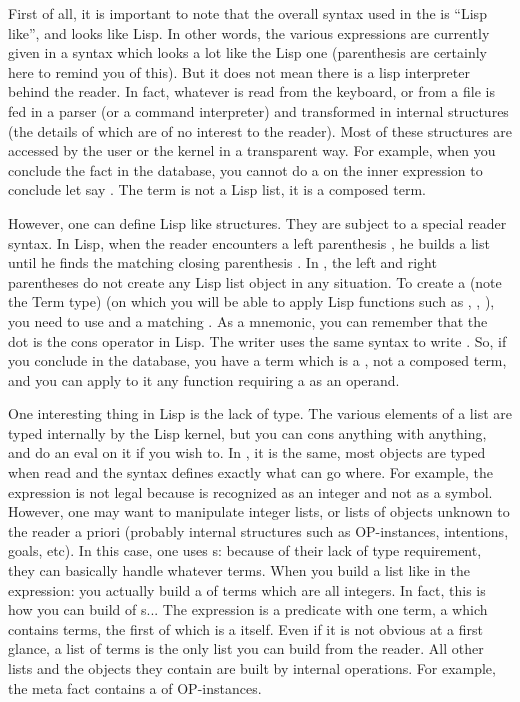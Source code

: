 First of all, it is important to note that the overall syntax used in the
\COPRSDE{} is ``Lisp like'', and looks like Lisp. In other words, the
various expressions are currently given in a syntax which looks a lot like the
Lisp one (parenthesis are certainly here to remind you of this). But it does
not mean there is a lisp interpreter behind the reader. In fact, whatever is
read from the keyboard, or from a file is fed in a parser (or a command
interpreter) and transformed in internal structures (the details of which are
of no interest to the reader). Most of these structures are accessed by the
user or the kernel in a transparent way. For example, when you conclude the
fact  in the database, you cannot do a  on the
inner expression  to conclude let say . The
term  is not a Lisp list, it is a composed term.

However, one can define Lisp like structures. They are subject to a special
reader syntax. In Lisp, when the reader encounters a left parenthesis \samp{(},
he builds a list until he finds the matching closing parenthesis \samp{)}. In
\COPRS{}, the left and right parentheses do not create any Lisp list object in
any situation. To create a  (note the Term type) (on which you
will be able to apply Lisp functions such as , ,
), you need to use  and a matching . As a
mnemonic, you can remember that the dot   is the cons operator in
Lisp. The \COPRS{} writer uses the same syntax to write . So, if
you conclude  in the database, you have a
 term which is a , not a composed term, and
you can apply to it any function requiring a  as an operand.

One interesting thing in Lisp is the lack of type. The various elements of a
list are typed internally by the Lisp kernel, but you can cons anything with
anything, and do an eval on it if you wish to. In \COPRS{}, it is the same, most
objects are typed when read and the syntax defines exactly what can go where.
For example, the expression  is not legal because
 is recognized as an integer and not as a symbol. However, one may want
to manipulate integer lists, or lists of objects unknown to the reader a priori
(probably internal structures such as OP-instances, intentions, goals, etc). In
this case, one uses s: because of their lack of type
requirement, they can basically handle whatever terms.  When you build a list
like in the expression:  you actually build a
 of terms which are all integers. In fact, this is how you can
build  of s... The expression  is a predicate with one term, a 
which contains terms, the first of which is a  itself. Even if
it is not obvious at a first glance, a list of terms is the only list you can
build from the reader.  All other lists and the objects they contain are built
by internal operations.  For example, the  meta fact contains a
 of OP-instances.


